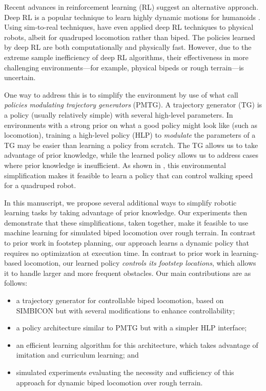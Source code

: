 \documentclass[conference]{IEEEtran}
\begin{document}
Recent advances in reinforcement learning (RL) suggest an alternative approach.
Deep RL is a popular technique to learn highly dynamic motions for humanoids \citep{peng2018deepmimic, heess2017emergence}.
Using sim-to-real techniques, \citet{tan2018sim} have even applied deep RL techniques to physical robots, albeit for quadruped locomotion rather than biped.
The policies learned by deep RL are both computationally and physically fast.
However, due to the extreme sample inefficiency of deep RL algorithms, their effectiveness in more challenging environments---for example, physical bipeds or rough terrain---is uncertain.

One way to address this is to simplify the environment by use of what \citet{iscen2018pmtg} call \emph{policies modulating trajectory generators} (PMTG).
A trajectory generator (TG) is a policy (usually relatively simple) with several high-level parameters.
In environments with a strong prior on what a good policy might look like (such as locomotion),
training a high-level policy (HLP) to \emph{modulate} the parameters of a TG may be easier than learning a policy from scratch.
The TG allows us to take advantage of prior knowledge, while the learned policy allows us to address cases where prior knowledge is insufficient.
As shown in \citet{iscen2018pmtg}, this environmental simplification makes it feasible to learn a policy that can control walking speed for a quadruped robot.

In this manuscript, we propose several additional ways to simplify robotic learning tasks by taking advantage of prior knowledge.
Our experiments then demonstrate that these simplifications, taken together, make it feasible to use machine learning for simulated biped locomotion over rough terrain.
In contrast to prior work in footstep planning, our approach learns a dynamic policy that requires no optimization at execution time.
In contrast to prior work in learning-based locomotion, our learned policy \emph{controls its footstep locations}, which allows it to handle larger and more frequent obstacles.
Our main contributions are as follows:
\begin{itemize}
  \item a trajectory generator for controllable biped locomotion, based on SIMBICON \citep{yin2007simbicon} but with several modifications to enhance controllability;
  \item a policy architecture similar to PMTG but with a simpler HLP interface;
  \item an efficient learning algorithm for this architecture, which takes advantage of imitation and curriculum learning; and
  \item simulated experiments evaluating the necessity and sufficiency of this approach for dynamic biped locomotion over rough terrain.
\end{itemize}
\end{document}
